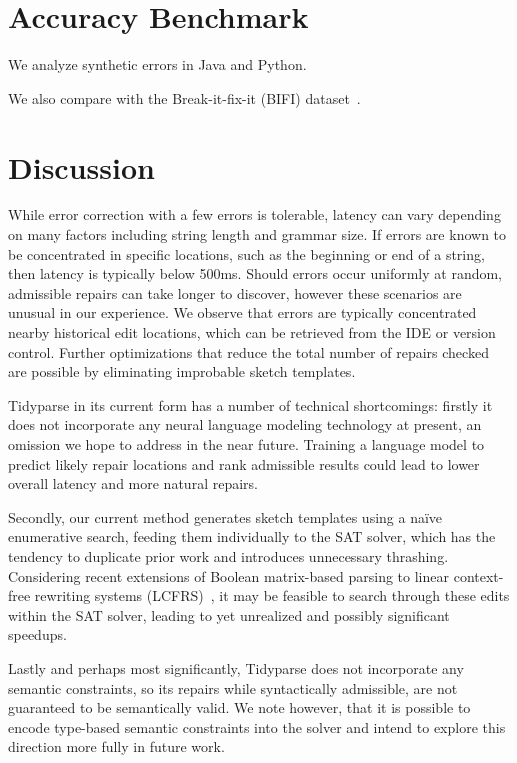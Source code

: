 \documentclass[sigplan,nonacm]{acmart}\settopmatter{printfolios=false,printccs=false,printacmref=false}
\begin{document}
\section{Accuracy Benchmark}

We analyze synthetic errors in Java and Python.

We also compare with the Break-it-fix-it (BIFI) dataset~\cite{yasunaga2021break}.

\section{Discussion}\label{sec:discussion}

While error correction with a few errors is tolerable, latency can vary depending on many factors including string length and grammar size. If errors are known to be concentrated in specific locations, such as the beginning or end of a string, then latency is typically below 500ms. Should errors occur uniformly at random, admissible repairs can take longer to discover, however these scenarios are unusual in our experience. We observe that errors are typically concentrated nearby historical edit locations, which can be retrieved from the IDE or version control. Further optimizations that reduce the total number of repairs checked are possible by eliminating improbable sketch templates.

Tidyparse in its current form has a number of technical shortcomings: firstly it does not incorporate any neural language modeling technology at present, an omission we hope to address in the near future. Training a language model to predict likely repair locations and rank admissible results could lead to lower overall latency and more natural repairs.

Secondly, our current method generates sketch templates using a na\"ive enumerative search, feeding them individually to the SAT solver, which has the tendency to duplicate prior work and introduces unnecessary thrashing. Considering recent extensions of Boolean matrix-based parsing to linear context-free rewriting systems (LCFRS)~\cite{cohen2016parsing}, it may be feasible to search through these edits within the SAT solver, leading to yet unrealized and possibly significant speedups.

Lastly and perhaps most significantly, Tidyparse does not incorporate any semantic constraints, so its repairs while syntactically admissible, are not guaranteed to be semantically valid. We note however, that it is possible to encode type-based semantic constraints into the solver and intend to explore this direction more fully in future work.
\end{document}
